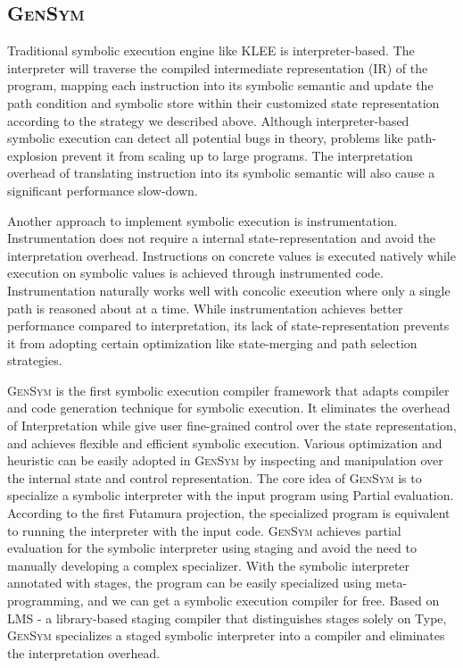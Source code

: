 \documentclass[sigplan, nonacm]{acmart}\settopmatter{printfolios=true,printccs=false,printacmref=false}
\newcommand{\tool}{\textsc{GenSym}\xspace}
\begin{document}
\subsection{\tool}
Traditional symbolic execution engine like KLEE\cite{cadar2008klee} is interpreter-based. The interpreter will traverse the compiled intermediate representation (IR) of the program, mapping each instruction into its symbolic semantic and update the path condition and symbolic store within their customized state representation according to the strategy we described above. Although interpreter-based symbolic execution can detect all potential bugs in theory, problems like path-explosion \cite{baldoni2018survey} prevent it from scaling up to large programs. The interpretation overhead of translating instruction into its symbolic semantic will also cause a significant performance slow-down.\par
Another approach to implement symbolic execution is instrumentation\cite{10.1145/1180405.1180445, CREST}. Instrumentation does not require a internal state-representation and avoid the interpretation overhead. Instructions on concrete values is executed natively while execution on symbolic values is achieved through instrumented code. Instrumentation naturally works well with concolic execution \cite{godefroid2005dart, sen2005cute} where only a single path is reasoned about at a time. While instrumentation achieves better performance compared to interpretation, its lack of state-representation prevents it from adopting certain optimization like state-merging and path selection strategies. \par
\tool is the first symbolic execution compiler framework that adapts compiler and code generation technique for symbolic execution. It eliminates the overhead of Interpretation while give user fine-grained control over the state representation, and achieves flexible and efficient symbolic execution. Various optimization and heuristic can be easily adopted in \tool by inspecting and manipulation over the internal state and control representation. The core idea of \tool is to specialize a symbolic interpreter with the input program using Partial evaluation\cite{damian1999partial}. According to the first Futamura projection\cite{Futamura1971, Futamura1999}, the specialized program is equivalent to running the interpreter with the input code. \tool achieves partial evaluation for the symbolic interpreter using staging\cite{DBLP:conf/pepm/TahaS97} and avoid the need to manually developing a complex specializer. With the symbolic interpreter annotated with stages, the program can be easily specialized using meta-programming, and we can get a symbolic execution compiler for free. Based on LMS\cite{rompf2010lightweight} - a library-based staging compiler that distinguishes stages solely on Type, \tool specializes a staged symbolic interpreter into a compiler and eliminates the interpretation overhead.
\end{document}
